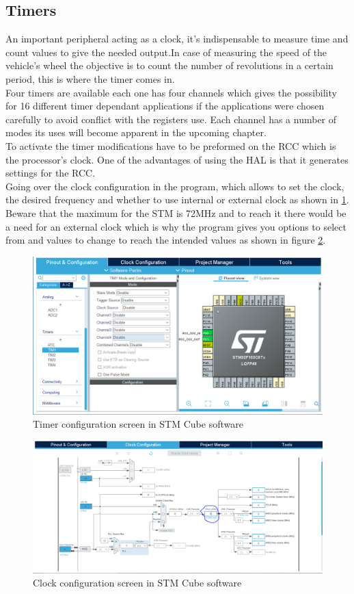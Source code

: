 \subsection{Timers}

An important peripheral acting as a clock, it’s indispensable to measure time and count values to give the needed output.In case of measuring the speed of the vehicle’s wheel the objective is to count the number of revolutions in a certain period, this is where the timer comes in.\\


Four timers are available each one has four channels which gives the possibility for 16 different timer dependant applications if the applications were chosen carefully to avoid conflict with the registers use. Each channel has a number of modes its uses will become apparent in the upcoming chapter. \\To activate the timer modifications have to be preformed on the RCC which is the processor’s clock. One of the advantages of using the HAL is that it generates settings for the RCC.\\

Going over the clock configuration in the program, which allows to set the clock, the desired frequency and whether to use internal or external clock as shown in  \ref{fig:timer-config}. Beware that the maximum for the STM is 72MHz and to reach it there would be a need for an external clock which is why the program gives you options to select from and values to change to reach the intended values as shown in figure \ref{fig:clock-config}.\\
\begin{figure}[h]
   \centering
    \includegraphics[width=.75\textwidth]{figure/4_2.png}
    \caption{Timer configuration screen in STM Cube software}
    \label{fig:timer-config}
\end{figure}
\begin{figure}[h]
   \centering
    \includegraphics[width=.75\textwidth]{figure/4_3.png}
    \caption{Clock configuration screen in STM Cube software}
    \label{fig:clock-config}
\end{figure}

